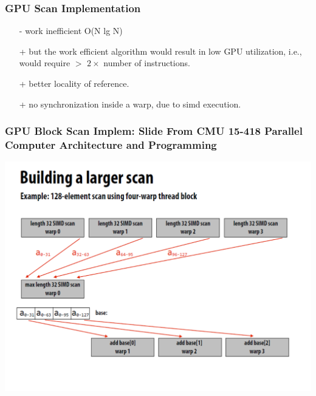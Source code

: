 \documentclass{beamer}
\begin{document}
\begin{frame}[fragile,t]
\frametitle{GPU Scan Implementation}
\begin{itemize}
    \item[-] \alert{work inefficient} O(N lg N)
    \item[+] but the work efficient algorithm 
                would result in low GPU utilization, 
                i.e.,  would require $>$ $2\times$ number of instructions.
    \item[+] better locality of reference.
    \item[+] no synchronization inside a {\sc warp}, due to {\sc simd} execution.
\end  {itemize}
\end{frame}

\begin{frame}[fragile,t]
\frametitle{{\tiny GPU Block Scan Implem: Slide From CMU 15-418 Parallel Computer Architecture and Programming}}

\includegraphics[width=55ex]{Figures/BlockScan}

\end{frame}
\end{document}
